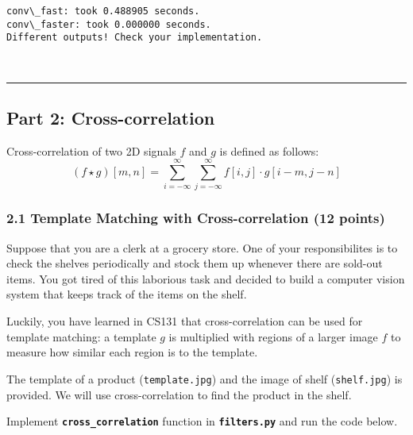 \documentclass[11pt]{article}
\begin{document}
    \begin{Verbatim}[commandchars=\\\{\}]
conv\_fast: took 0.488905 seconds.
conv\_faster: took 0.000000 seconds.
Different outputs! Check your implementation.

    \end{Verbatim}

    \begin{center}
    \end{center}
    { \hspace*{\fill} \\}
    
    \begin{center}\rule{0.5\linewidth}{\linethickness}\end{center}

\subsection{Part 2: Cross-correlation}\label{part-2-cross-correlation}

Cross-correlation of two 2D signals \(f\) and \(g\) is defined as
follows:
\[(f\star{g})[m,n]=\sum_{i=-\infty}^\infty\sum_{j=-\infty}^\infty f[i,j]\cdot g[i-m,j-n]\]

    \subsubsection{2.1 Template Matching with Cross-correlation (12
points)}\label{template-matching-with-cross-correlation-12-points}

Suppose that you are a clerk at a grocery store. One of your
responsibilites is to check the shelves periodically and stock them up
whenever there are sold-out items. You got tired of this laborious task
and decided to build a computer vision system that keeps track of the
items on the shelf.

Luckily, you have learned in CS131 that cross-correlation can be used
for template matching: a template \(g\) is multiplied with regions of a
larger image \(f\) to measure how similar each region is to the
template.

The template of a product (\texttt{template.jpg}) and the image of shelf
(\texttt{shelf.jpg}) is provided. We will use cross-correlation to find
the product in the shelf.

Implement \textbf{\texttt{cross\_correlation}} function in
\textbf{\texttt{filters.py}} and run the code below.
\end{document}

